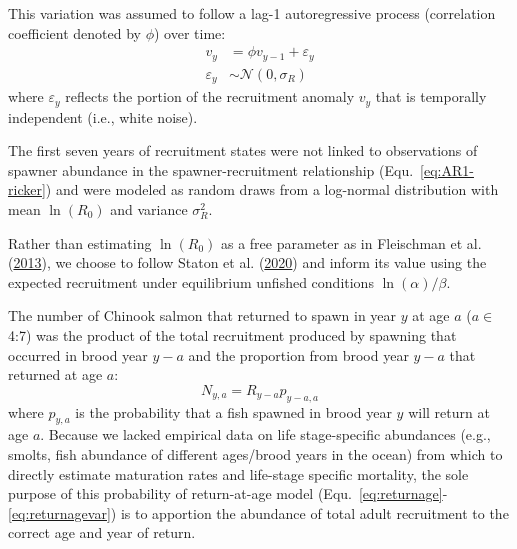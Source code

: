 \documentclass[11pt]{book}
\begin{document}
This variation was assumed to follow a lag-1 autoregressive process (correlation coefficient denoted by \(\phi\)) over time:
\begin{equation}
  \begin{aligned}
  v_y &= \phi v_{y-1} + \varepsilon_y \\
  \varepsilon_y &\sim \mathcal{N}(0, \sigma_R)
  \end{aligned}
  \label{eq:eq-residuals}
\end{equation}
where \(\varepsilon_y\) reflects the portion of the recruitment anomaly \(v_y\) that is temporally independent (i.e., white noise).

The first seven years of recruitment states were not linked to observations of spawner abundance in the spawner-recruitment relationship (Equ.~\ref{eq:AR1-ricker}) and were modeled as random draws from a log-normal distribution with mean \(\ln(R_0)\) and variance \(\sigma_R^2\).

Rather than estimating \(\ln(R_0)\) as a free parameter as in Fleischman et al. (\protect\hyperlink{ref-fleischman-etal-2013}{2013}), we choose to follow Staton et al. (\protect\hyperlink{ref-staton-etal-2020}{2020}) and inform its value using the expected recruitment under equilibrium unfished conditions \(\ln(\alpha)/\beta\).

The number of Chinook salmon that returned to spawn in year \(y\) at age \(a\) (\(a \in\) 4:7) was the product of the total recruitment produced by spawning that occurred in brood year \(y-a\) and the proportion from brood year \(y-a\) that returned at age \(a\):
\begin{equation}
  N_{y,a} = R_{y-a} p_{y-a,a}
  \label{eq:returnage}
\end{equation}
where \(p_{y,a}\) is the probability that a fish spawned in brood year \(y\) will return at age \(a\). Because we lacked empirical data on life stage-specific abundances (e.g., smolts, fish abundance of different ages/brood years in the ocean) from which to directly estimate maturation rates and life-stage specific mortality, the sole purpose of this probability of return-at-age model (Equ.~\ref{eq:returnage}-\ref{eq:returnagevar}) is to apportion the abundance of total adult recruitment to the correct age and year of return.
\end{document}
